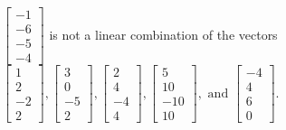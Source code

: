 \begin{exercise}
\begin{exerciseStatement}
  \end{exerciseStatement}
  \begin{exerciseAnswer}
   \(\left[\begin{array}{c}
-1 \\
-6 \\
-5 \\
-4
\end{array}\right]\) 
  	 is not  
	a linear combination of the vectors \(\left[\begin{array}{c}
1 \\
2 \\
-2 \\
2
\end{array}\right] , \left[\begin{array}{c}
3 \\
0 \\
-5 \\
2
\end{array}\right] , \left[\begin{array}{c}
2 \\
4 \\
-4 \\
4
\end{array}\right] , \left[\begin{array}{c}
5 \\
10 \\
-10 \\
10
\end{array}\right] , \text{ and } \left[\begin{array}{c}
-4 \\
4 \\
6 \\
0
\end{array}\right]\).

	
  


  \end{exerciseAnswer}
\end{exercise}